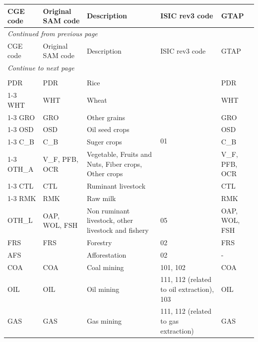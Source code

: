 \documentclass[10pt,a4paper,titlepage,dvipdfmx]{book}
\begin{document}
\begin{tabularx}{\textwidth}{|
p{}|
p{}|
p{}|
p{}|
p{}|} 
\caption{\label{tab:List of sectors} List of sectors} \\
 \hline
CGE code & Original SAM code & Description & ISIC rev3 code & GTAP \\ \hline\hline
 \endfirsthead
 \multicolumn{5}{l}{\small\it Continued from previous page}\\
 \hline
CGE code & Original SAM code & Description & ISIC rev3 code & GTAP \\ \hline\hline
 \endhead
 \hline
 \multicolumn{5}{l}{\small\it Continue to next page}\\
 \endfoot
 \hline
 \multicolumn{4}{l}{\small\it End}\\
 \endlastfoot
\hline
PDR & PDR & Rice & \multirow{8}{=}{01}  & PDR \\\cline{1-3}\cline{5-5}
WHT & WHT & Wheat &  &  WHT \\\cline{1-3}\cline{5-5}
GRO & GRO & Other grains &  &  GRO \\\cline{1-3}\cline{5-5}
OSD & OSD & Oil seed crops &  &  OSD \\\cline{1-3}\cline{5-5}
C\_B &  C\_B & Suger crops &  &  C\_B \\\cline{1-3}\cline{5-5}
OTH\_A & V\_F, PFB, OCR & Vegetable, Fruits and Nuts, Fiber crops, Other crops &  & V\_F, PFB, OCR \\\cline{1-3}\cline{5-5}
CTL & CTL & Ruminant livestock &  & CTL \\\cline{1-3}\cline{5-5}
RMK & RMK & Raw milk &  & RMK \\\hline 
OTH\_L & OAP, WOL, FSH & Non ruminant livestock, other livestock and fishery & 05 & OAP, WOL, FSH \\\hline 
FRS & FRS & Forestry & 02 & FRS \\\hline 
AFS &  & Afforestation & 02 & - \\\hline 
COA & COA & Coal mining & 101, 102 & COA \\\hline 
OIL & OIL & Oil mining & 111, 112 (related to oil extraction), 103 & OIL \\\hline 
GAS & GAS & Gas mining & 111, 112 (related to gas extraction) & GAS \\\hline 

\end{tabularx}
\end{document}

